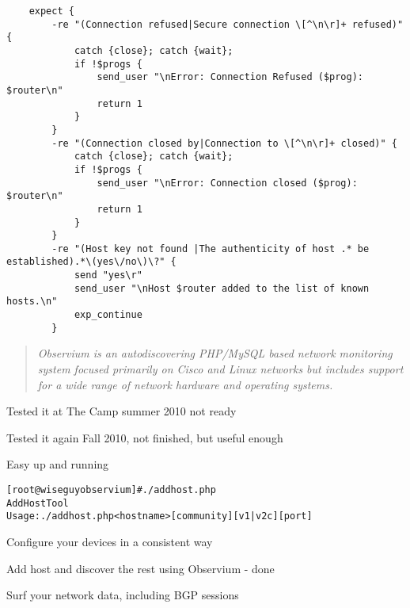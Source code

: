 \documentclass[28pt,landscape,a4paper,footrule]{foils}
\begin{document}

\footnotesize
\begin{verbatim}
    expect {
        -re "(Connection refused|Secure connection \[^\n\r]+ refused)" {
            catch {close}; catch {wait};
            if !$progs {
                send_user "\nError: Connection Refused ($prog): $router\n"
                return 1
            }
        }
        -re "(Connection closed by|Connection to \[^\n\r]+ closed)" {
            catch {close}; catch {wait};
            if !$progs {
                send_user "\nError: Connection closed ($prog): $router\n"
                return 1
            }
        }
        -re "(Host key not found |The authenticity of host .* be established).*\(yes\/no\)\?" {
            send "yes\r"
            send_user "\nHost $router added to the list of known hosts.\n"
            exp_continue
        }
\end{verbatim}
\normalsize



\begin{quote}
\it Observium is an autodiscovering PHP/MySQL based network monitoring system focused primarily on Cisco and Linux networks but includes support for a wide range of network hardware and operating systems.
\end{quote}

\begin{slidelist}
\item Tested it at The Camp summer 2010 not ready
\item Tested it again Fall 2010, not finished, but useful enough
\item {}
\item Easy up and running\\
\end{slidelist}



\begin{alltt}
[root@wiseguy observium]# ./addhost.php 
Add Host Tool
Usage: ./addhost.php <hostname> [community] [v1|v2c] [port]
\end{alltt}

\begin{slidelist}
\item Configure your devices in a consistent way
\item Add host and discover the rest using Observium - done
\item Surf your network data, including BGP sessions
\end{slidelist}
\end{document}
